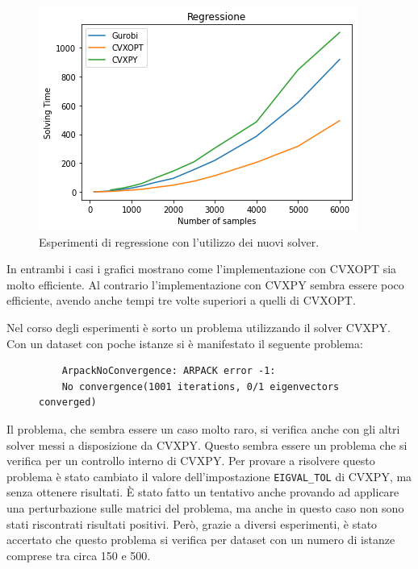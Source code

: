 \documentclass[a4paper,12pt]{report}
\begin{document}
\begin{figure}[H]
    \centering
    \includegraphics[scale=0.8]{images/Grafici/DifferentSolver_Regressione.png}
    \caption{Esperimenti di regressione con l'utilizzo dei nuovi solver.}
    \label{fig:differeSolver_Regressione}
\end{figure}

\noindent In entrambi i casi i grafici mostrano come l'implementazione con CVXOPT sia molto efficiente. Al contrario l'implementazione con CVXPY sembra essere poco efficiente, avendo anche tempi tre volte superiori a quelli di CVXOPT. 

\noindent Nel corso degli esperimenti è sorto un problema utilizzando il solver CVXPY. Con un dataset con poche istanze si è manifestato il seguente problema:
\begin{figure}[H]
    \centering
    \begin{verbatim}
    ArpackNoConvergence: ARPACK error -1: 
    No convergence(1001 iterations, 0/1 eigenvectors converged)        
    \end{verbatim}
\end{figure}

\noindent Il problema, che sembra essere un caso molto raro, si verifica anche con gli altri solver messi a disposizione da CVXPY. Questo sembra essere un problema che si verifica per un controllo interno di CVXPY. Per provare a risolvere questo problema è stato cambiato il valore dell'impostazione \texttt{EIGVAL\_TOL} di CVXPY, ma senza ottenere risultati. \`E stato fatto un tentativo anche provando ad applicare una perturbazione sulle matrici del problema, ma anche in questo caso non sono stati riscontrati risultati positivi. Però, grazie a diversi esperimenti, è stato accertato che questo problema si verifica per dataset con un numero di istanze comprese tra circa 150 e 500.
\end{document}
